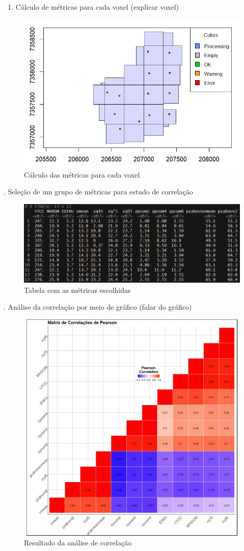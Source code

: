 \documentclass[
]{article}
\providecommand{\tightlist}{%
  \setlength{\itemsep}{0pt}\setlength{\parskip}{0pt}}
\begin{document}
\begin{enumerate}
\def\labelenumi{\arabic{enumi}.}
\setcounter{enumi}{10}
\tightlist
\item
  Cálculo de métricas para cada voxel (explicar voxel)
\end{enumerate}

\begin{figure}

{\centering \includegraphics[width=0.5\linewidth]{IMAGES/calculo-metricas-voxel} 

}

\caption{Cálculo das métricas para cada voxel}\label{fig:unnamed-chunk-17}
\end{figure}

. Seleção de um grupo de métricas para estudo de correlação

\begin{figure}

{\centering \includegraphics[width=0.5\linewidth]{IMAGES/tb-subgrupo-de-metricas-p-analise} 

}

\caption{Tabela com as métricas escolhidas}\label{fig:unnamed-chunk-18}
\end{figure}

. Análise da correlação por meio de gráfico (falar do gráfico)

\begin{figure}

{\centering \includegraphics[width=0.5\linewidth]{IMAGES/MatrizDeCorrelacoes} 

}

\caption{Resultado da análise de correlação}\label{fig:unnamed-chunk-19}
\end{figure}
\end{document}
